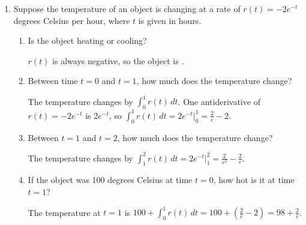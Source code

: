 \documentclass{article}
\begin{document}
\begin{enumerate}
\begin{enumerate}
  \end{enumerate}

  \pspace{\newpage}

\item
  Suppose the temperature of an object is changing at a rate of $r(t) =
  -2e^{-t}$ degrees Celsius per hour, where $t$ is given in hours.

  \begin{enumerate}

  \item
    \begin{problem}
      Is the object heating or cooling?
    \end{problem}
    \pspace{\vfill}

    \begin{solution}
      $r(t)$ is always negative, so the object is . 
    \end{solution}

  \item
    \begin{problem}
      Between time $t=0$ and $t=1$, how much does the temperature change?
    \end{problem}
    \pspace{\vfill}

    \begin{solution}
      The temperature changes by $\displaystyle \int_0^1 r(t)\,dt$.  One
      antiderivative of $r(t) = - 2 e^{-t}$ is $2 e^{-t}$, so
      $\displaystyle \int_0^1 r(t)\,dt = 2 e^{-t} \Big|_0^1 =
      \boxed{\frac{2}{e} - 2}$. 
    \end{solution}

  \item
    \begin{problem}
      Between $t=1$ and $t=2$, how much does the temperature change?
    \end{problem}
    \pspace{\vfill}

    \begin{solution}
      The temperature changes by $\displaystyle \int_1^2 r(t)\,dt = 2
      e^{-t} \Big|_1^2 = \boxed{\frac{2}{e^2} - \frac{2}{e}}$. 
    \end{solution}

  \item
    \begin{problem}
      If the object was 100 degrees Celsius at time $t=0$, how hot is it
      at time $t=1$?
    \end{problem}
    \pspace{\vfill}

    \begin{solution}
      The temperature at $t = 1$ is $100 + \displaystyle \int_0^1 r(t)\,dt
      = 100 + \left( \frac{2}{e} - 2 \right) = \boxed{98 + \frac{2}{e}}$.
    \end{solution}


\end{enumerate}
\end{enumerate}
\end{document}
